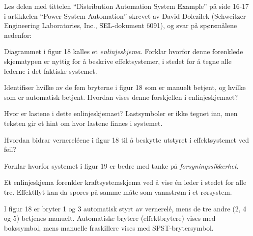 

Les delen med tittelen ``Distribution Automation System Example'' på side 16-17 i artikkelen ``Power System Automation'' skrevet av David Dolezilek (Schweitzer Engineering Laboratories, Inc., SEL-dokument 6091), og svar på spørsmålene nedenfor:

\vskip 10pt

Diagrammet i figur 18 kalles et {\it enlinjeskjema}. Forklar hvorfor denne forenklede skjematypen er nyttig for å beskrive effektsystemer, i stedet for å tegne alle lederne i det faktiske systemet.

\vskip 10pt

Identifiser hvilke av de fem bryterne i figur 18 som er manuelt betjent, og hvilke som er automatisk betjent. Hvordan vises denne forskjellen i enlinjeskjemaet?

\vskip 10pt

Hvor er lastene i dette enlinjeskjemaet? Lastsymboler er ikke tegnet inn, men teksten gir et hint om hvor lastene finnes i systemet.

\vskip 10pt

Hvordan bidrar vernereléene i figur 18 til å beskytte utstyret i effektsystemet ved feil?

\vskip 10pt

Forklar hvorfor systemet i figur 19 er bedre med tanke på {\it forsyningssikkerhet}.














Et enlinjeskjema forenkler kraftsystemskjema ved å vise én leder i stedet for alle tre. Effektflyt kan da spores på samme måte som vannstrøm i et rørsystem.

\vskip 10pt

I figur 18 er bryter 1 og 3 automatisk styrt av vernerelé, mens de tre andre (2, 4 og 5) betjenes manuelt. Automatiske brytere (effektbrytere) vises med bokssymbol, mens manuelle fraskillere vises med SPST-brytersymbol.

